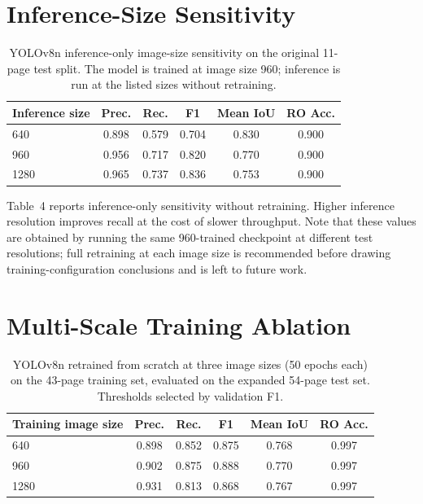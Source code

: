 \documentclass[pdflatex,sn-mathphys-num]{sn-jnl}
\begin{document}
\section{Inference-Size Sensitivity}

\begin{table}[t]
\centering
\scriptsize\setlength{\tabcolsep}{3pt}
\caption{YOLOv8n inference-only image-size sensitivity on the original 11-page test split. The model is trained at image size 960; inference is run at the listed sizes without retraining.}
\begin{tabular}{lccccc}
\toprule
Inference size & Prec. & Rec. & F1 & Mean IoU & RO Acc. \\
\midrule
640 & 0.898 & 0.579 & 0.704 & 0.830 & 0.900 \\
960 & 0.956 & 0.717 & 0.820 & 0.770 & 0.900 \\
1280 & 0.965 & 0.737 & 0.836 & 0.753 & 0.900 \\
\bottomrule
\end{tabular}
\end{table}

Table~4 reports inference-only sensitivity without retraining. Higher inference resolution improves recall at the cost of slower throughput. Note that these values are obtained by running the same 960-trained checkpoint at different test resolutions; full retraining at each image size is recommended before drawing training-configuration conclusions and is left to future work.

\section{Multi-Scale Training Ablation}

\begin{table}[t]
\centering
\scriptsize\setlength{\tabcolsep}{3pt}
\caption{YOLOv8n retrained from scratch at three image sizes (50 epochs each) on the 43-page training set, evaluated on the expanded 54-page test set. Thresholds selected by validation F1.}
\begin{tabular}{lccccc}
\toprule
Training image size & Prec. & Rec. & F1 & Mean IoU & RO Acc. \\
\midrule
640 & 0.898 & 0.852 & 0.875 & 0.768 & 0.997 \\
960 & 0.902 & 0.875 & 0.888 & 0.770 & 0.997 \\
1280 & 0.931 & 0.813 & 0.868 & 0.767 & 0.997 \\
\bottomrule
\end{tabular}
\end{table}
\end{document}
